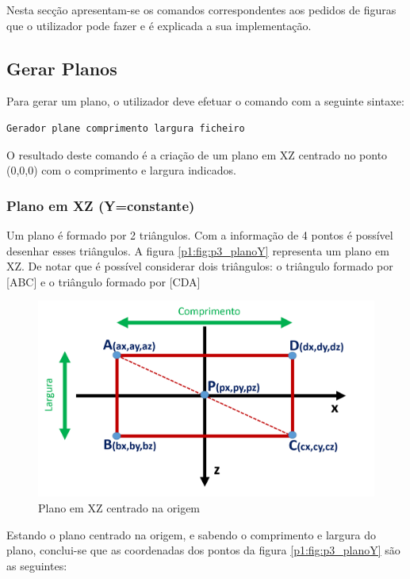Nesta secção apresentam-se os comandos correspondentes aos pedidos de figuras que o utilizador pode fazer e é explicada a sua implementação.

\subsection{Gerar Planos}
\label{p3:planos}

Para gerar um plano, o utilizador deve efetuar o comando com a seguinte sintaxe:

\begin{Verbatim}
Gerador plane comprimento largura ficheiro
\end{Verbatim}

O resultado deste comando é a criação de um plano em XZ centrado no ponto (0,0,0) com o comprimento e largura indicados.

\subsubsection{Plano em XZ (Y=constante)}

Um plano é formado por 2 triângulos. Com a informação de 4 pontos é possível desenhar esses triângulos. A figura \ref{p1:fig:p3_planoY} representa um plano em XZ. De notar que é possível considerar dois triângulos: o triângulo formado por [ABC] e o triângulo formado por [CDA]

\begin{figure}[<+htpb+>]
	\centering
	\includegraphics[scale=0.5]{imagens/p3_planoY.png}
	\caption{Plano em XZ centrado na origem}
	\label{p1:fig:p1_planoY}
\end{figure}

Estando o plano centrado na origem, e sabendo o comprimento e largura do plano, conclui-se que as coordenadas dos pontos da figura \ref{p1:fig:p3_planoY} são as seguintes:

